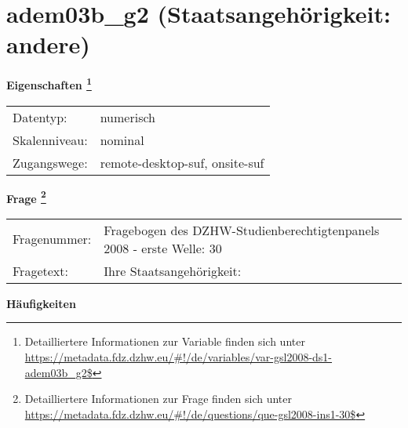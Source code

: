 
    \setcounter{footnote}{0}

    \vspace*{-1.8cm}
	\section{adem03b\_g2 (Staatsangehörigkeit: andere)}
	\label{section:adem03b_g2}



    \vspace*{0.5cm}
    \noindent\textbf{Eigenschaften
	\footnote{Detailliertere Informationen zur Variable finden sich unter
		\url{https://metadata.fdz.dzhw.eu/\#!/de/variables/var-gsl2008-ds1-adem03b_g2$}}}\\
	\begin{tabularx}{\hsize}{@{}lX}
	Datentyp: & numerisch \\
	Skalenniveau: & nominal \\
	Zugangswege: &
	  remote-desktop-suf, 
	  onsite-suf
 \\
    \end{tabularx}



				\vspace*{0.5cm}
                \noindent\textbf{Frage
	                \footnote{Detailliertere Informationen zur Frage finden sich unter
		              \url{https://metadata.fdz.dzhw.eu/\#!/de/questions/que-gsl2008-ins1-30$}}}\\
				\begin{tabularx}{\hsize}{@{}lX}
					Fragenummer: &
					  Fragebogen des DZHW-Studienberechtigtenpanels 2008 - erste Welle:
					  30
 \\
					Fragetext: & Ihre Staatsangehörigkeit: \\
				\end{tabularx}





        		\vspace*{0.5cm}
                \noindent\textbf{Häufigkeiten}

